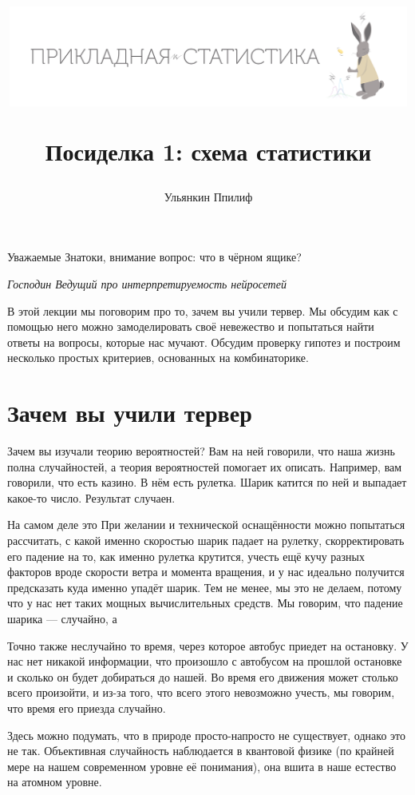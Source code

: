 \documentclass[12pt, a4paper, oneside]{article}
\title{
\begin{center} 
\includegraphics[width=0.99\textwidth]{logo.png}
\end{center}

Посиделка 1: схема статистики}
\date{ } %
\author{Ульянкин Ппилиф}
\begin{document}

\maketitle

\epigraph{Уважаемые Знатоки, внимание вопрос: что в чёрном ящике?}{\textit{Господин Ведущий про интерпретируемость нейросетей}}


В этой лекции мы поговорим про то, зачем вы учили тервер. Мы обсудим как с помощью него можно замоделировать своё невежество и попытаться найти ответы на вопросы, которые нас мучают. Обсудим проверку гипотез и построим несколько простых критериев, основанных на комбинаторике.

\section{Зачем вы учили тервер}

Зачем вы изучали теорию вероятностей? Вам на ней говорили, что наша жизнь полна случайностей, а теория вероятностей помогает их описать. Например, вам говорили, что есть казино. В нём есть рулетка. Шарик катится по ней и выпадает какое-то число. Результат случаен. 

На самом деле это  При желании и технической оснащённости можно попытаться рассчитать, с какой именно скоростью шарик падает на рулетку, скорректировать его падение на то, как именно рулетка крутится, учесть ещё кучу разных факторов вроде скорости ветра и момента вращения, и у нас идеально получится предсказать куда именно упадёт шарик. Тем не менее, мы это не делаем, потому что у нас нет таких мощных вычислительных средств. Мы говорим, что падение шарика --- случайно, а 

Точно также неслучайно то время, через которое автобус приедет на остановку. У нас нет никакой информации, что произошло с автобусом  на прошлой остановке и сколько он будет добираться до нашей. Во время его движения может столько всего произойти, и из-за того, что всего этого невозможно учесть, мы говорим, что время его приезда случайно.

Здесь можно подумать, что  в природе просто-напросто не существует, однако это не так. Объективная случайность наблюдается в квантовой физике (по крайней мере на нашем современном уровне её понимания), она вшита в наше естество на атомном уровне. 
\end{document}
